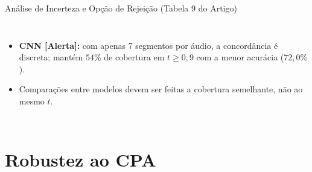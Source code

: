 \documentclass[aspectratio=169]{beamer}
\begin{document}
\begin{frame}{An\'{a}lise de Incerteza e Op\c{c}\~{a}o de Rejei\c{c}\~{a}o (Tabela 9 do Artigo)}
\begin{columns}[T]
        \footnotesize
        \begin{itemize}
            \item \textbf{CNN [Alerta]:} com apenas 7 segmentos por \'{a}udio, a concord\^{a}ncia \'{e} discreta; mant\'{e}m $54\%$ de cobertura em $t \ge 0,9$ com a menor acur\'{a}cia ($72,0\%$).
            \item Compara\c{c}\~{o}es entre modelos devem ser feitas a cobertura semelhante, n\~{a}o ao mesmo $t$.
        \end{itemize}
    \end{columns}
\end{frame}

\section{Robustez ao CPA}
\end{document}
